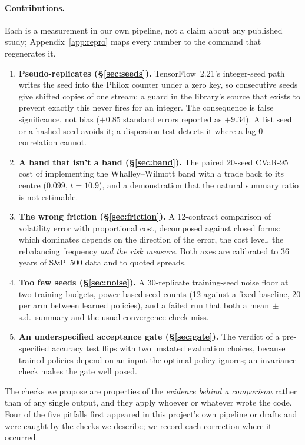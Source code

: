 \documentclass{article}
\newcommand{\cvar}{CVaR-95}
\begin{document}
\paragraph{Contributions.} Each is a measurement in our own pipeline, not a claim about any
published study; Appendix~\ref{app:repro} maps every number to the command that regenerates it.
\begin{enumerate}
\item \textbf{Pseudo-replicates (\S\ref{sec:seeds}).} TensorFlow~2.21's integer-seed path writes
  the seed into the Philox counter under a zero key, so consecutive seeds give shifted copies of
  one stream; a guard in the library's source that exists to prevent exactly this never fires for
  an integer. The consequence is false significance, not bias ($+0.85$ standard errors reported
  as $+9.34$). A list seed or a hashed seed avoids it; a dispersion test detects it where a lag-0
  correlation cannot.
\item \textbf{A band that isn't a band (\S\ref{sec:band}).} The paired 20-seed \cvar{} cost of
  implementing the Whalley--Wilmott band with a trade back to its centre ($0.099$, $t = 10.9$),
  and a demonstration that the natural summary ratio is not estimable.
\item \textbf{The wrong friction (\S\ref{sec:friction}).} A 12-contract comparison of volatility
  error with proportional cost, decomposed against closed forms: which dominates depends on the
  direction of the error, the cost level, the rebalancing frequency \emph{and the risk measure}.
  Both axes are calibrated to 36 years of S\&P~500 data and to quoted spreads.
\item \textbf{Too few seeds (\S\ref{sec:noise}).} A 30-replicate training-seed noise floor at two
  training budgets, power-based seed counts (12 against a fixed baseline, 20 per arm between
  learned policies), and a failed run that both a mean$\,\pm\,$s.d.\ summary and the usual
  convergence check miss.
\item \textbf{An underspecified acceptance gate (\S\ref{sec:gate}).} The verdict of a
  pre-specified accuracy test flips with two unstated evaluation choices, because trained
  policies depend on an input the optimal policy ignores; an invariance check makes the gate
  well posed.
\end{enumerate}

The checks we propose are properties of the \emph{evidence behind a comparison} rather than of
any single output, and they apply whoever or whatever wrote the code. Four of the five pitfalls
first appeared in this project's own pipeline or drafts and were caught by the checks we
describe; we record each correction where it occurred.
\end{document}
